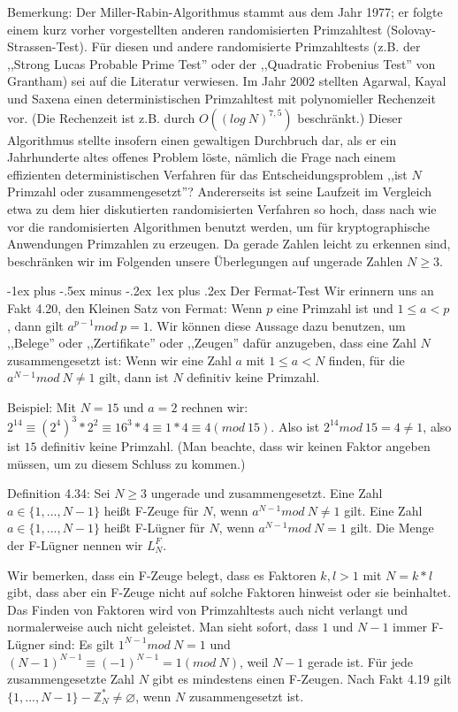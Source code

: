 \documentclass[a4paper]{article}
\makeatletter
\renewcommand{\subsubsection}{\@startsection{subsubsection}{3}{0mm}%
 {-1ex plus -.5ex minus -.2ex}%
 {1ex plus .2ex}%
 {\normalfont\small\bfseries}}
\makeatother
\begin{document}
\begin{multicols}{3}
        Bemerkung: Der Miller-Rabin-Algorithmus stammt aus dem Jahr 1977; er folgte einem kurz vorher vorgestellten anderen randomisierten Primzahltest (Solovay-Strassen-Test). Für diesen und andere randomisierte Primzahltests (z.B. der ,,Strong Lucas Probable Prime Test'' oder der ,,Quadratic Frobenius Test'' von Grantham) sei auf die Literatur verwiesen. Im Jahr 2002 stellten Agarwal, Kayal und Saxena einen deterministischen Primzahltest mit polynomieller Rechenzeit vor. (Die Rechenzeit ist z.B. durch $O((log\ N)^{7,5})$ beschränkt.) Dieser Algorithmus stellte insofern einen gewaltigen Durchbruch dar, als er ein Jahrhunderte altes offenes Problem löste, nämlich die Frage nach einem effizienten deterministischen Verfahren für das Entscheidungsproblem ,,ist $N$ Primzahl oder zusammengesetzt''? Andererseits ist seine Laufzeit im Vergleich etwa zu dem hier diskutierten randomisierten Verfahren so hoch, dass nach wie vor die randomisierten Algorithmen benutzt werden, um für kryptographische Anwendungen Primzahlen zu erzeugen.
        Da gerade Zahlen leicht zu erkennen sind, beschränken wir im Folgenden unsere Überlegungen auf ungerade Zahlen $N\geq 3$.

        \subsubsection{Der Fermat-Test}
        Wir erinnern uns an Fakt 4.20, den Kleinen Satz von Fermat: Wenn $p$ eine Primzahl ist und $1\leq a < p$, dann gilt $a^{p-1} mod\ p=1$.
        Wir können diese Aussage dazu benutzen, um ,,Belege'' oder ,,Zertifikate'' oder ,,Zeugen'' dafür anzugeben, dass eine Zahl $N$ zusammengesetzt ist: Wenn wir eine Zahl $a$ mit $1\leq a < N$ finden, für die $a^{N-1} mod\ N\not=1$ gilt, dann ist $N$ definitiv keine
        Primzahl.

        Beispiel: Mit $N=15$ und $a=2$ rechnen wir: $2^{14}\equiv (2^4)^3 * 2^2 \equiv 16^3*4 \equiv 1*4\equiv 4 (mod\ 15)$. Also ist $2^{14} mod\ 15 = 4\not= 1$, also ist $15$ definitiv keine Primzahl. (Man beachte, dass wir keinen Faktor angeben müssen, um zu diesem Schluss zu kommen.)

        Definition 4.34: Sei $N\geq 3$ ungerade und zusammengesetzt. Eine Zahl $a\in\{1,...,N-1\}$ heißt F-Zeuge für $N$, wenn $a^{N-1} mod\ N\not= 1$ gilt. Eine Zahl $a\in\{1,...,N-1\}$ heißt F-Lügner für $N$, wenn $a^{N-1} mod\ N=1$ gilt. Die Menge der F-Lügner nennen wir $L^F_N$.

        Wir bemerken, dass ein F-Zeuge belegt, dass es Faktoren $k,l >1$ mit $N=k*l$ gibt, dass aber ein F-Zeuge nicht auf solche Faktoren hinweist oder sie beinhaltet. Das Finden von Faktoren wird von Primzahltests auch nicht verlangt und normalerweise auch nicht geleistet.
        Man sieht sofort, dass $1$ und $N-1$ immer F-Lügner sind: Es gilt $1^{N-1} mod\ N=1$ und $(N-1)^{N-1} \equiv (-1)^{N-1}=1 (mod\ N)$, weil $N-1$ gerade ist.
        Für jede zusammengesetzte Zahl $N$ gibt es mindestens einen F-Zeugen. Nach Fakt 4.19 gilt $\{1,...,N-1\}-\mathbb{Z}^*_N\not=\varnothing$, wenn $N$ zusammengesetzt ist.


\end{multicols}
\end{document}
